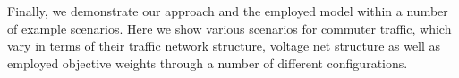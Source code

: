 
Finally, we demonstrate our approach and the employed model within a number of example scenarios. Here we show various scenarios for commuter traffic, which vary in terms of their traffic network structure, voltage net structure as well as employed objective weights through a number of different configurations.
